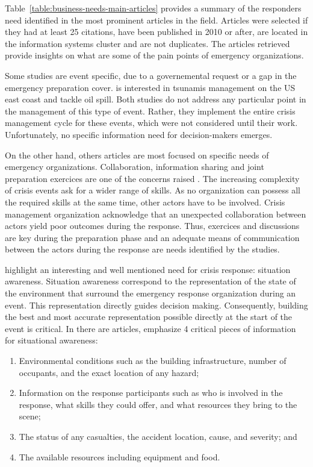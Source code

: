 Table~\ref{table:business-needs-main-articles} provides a summary of the responders need identified in the most prominent articles in the field.
Articles were selected if they had at least 25 citations, have been published in 2010 or after, are located in the information systems cluster and are not duplicates.
The articles retrieved provide insights on what are some of the pain points of emergency organizations.

Some studies are event specific, due to a governemental request or a gap in the emergency preparation cover.
\textcite{lindellTsunamiPreparednessOregon2010} is interested in tsunamis management on the US east coast and \textcite{cabreraaguileraModellingPerformanceVariabilities2016} tackle oil spill.
Both studies do not address any particular point in the management of this type of event.
Rather, they implement the entire crisis management cycle for these events, which were not considered until their work.
Unfortunately, no specific information need for decision-makers emerges.

On the other hand, others articles are most focused on specific needs of emergency organizations.
Collaboration, information sharing and joint preparation exercices are one of the concerns raised \parencite{berlinWhyCollaborationMinimised2011,parkerSurfaceWaterFlood2011}.
The increasing complexity of crisis events ask for a wider range of skills.
As no organization can possess all the required skills at the same time, other actors have to be involved.
Crisis management organization acknowledge that an unexpected collaboration between actors yield poor outcomes during the response.
Thus, exercices and discussions are key during the preparation phase and an adequate means of communication between the actors during the response are needs identified by the studies.

\textcite{yangDesignPrinciplesIntegrated2012} highlight an interesting and well mentioned need for crisis response: situation awareness.
Situation awareness correspond to the representation of the state of the environment that surround the emergency response organization during an event.
This representation directly guides decision making.
Consequently, building the best and most accurate representation possible directly at the start of the event is critical.
In there are articles, \citeauthor{yangDesignPrinciplesIntegrated2012} emphasize 4 critical pieces of information for situational awareness:

\begin{enumerate}
    \item Environmental conditions such as the building infrastructure, number of occupants, and the exact location of any hazard;
    \item Information on the response participants such as who is involved in the response, what skills they could offer, and what resources they bring to the scene;
    \item The status of any casualties, the accident location, cause, and severity; and
    \item The available resources including equipment and food.
\end{enumerate}

